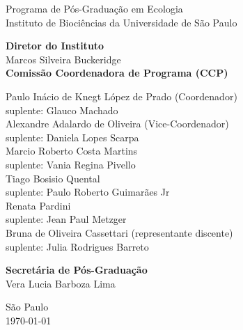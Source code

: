 \begin{center}

{\LARGE Programa de Pós-Graduação em Ecologia \\[1ex]
  Instituto de Biociências da Universidade de São Paulo\\[1ex]
  }
\par
\vspace{0.01\paperheight}
{\Large 
\textbf{Diretor do Instituto} \\[0.5em]
Marcos Silveira Buckeridge\\
\vspace{2em}
\textbf{Comissão Coordenadora de Programa (CCP)} \\[0.5em]
\begin{spacing}{1.2}
  Paulo Inácio de Knegt López de Prado (Coordenador)\\
  suplente: Glauco Machado \\ [0.75 em]
  Alexandre Adalardo de Oliveira (Vice-Coordenador)\\
  suplente: Daniela Lopes Scarpa \\ [0.75 em]
  Marcio Roberto Costa Martins\\
  suplente: Vania Regina Pivello \\ [0.75 em]
  Tiago Bosisio Quental\\
  suplente: Paulo Roberto Guimarães Jr\\ [0.75 em]
  Renata Pardini\\
  suplente:  Jean Paul Metzger  \\ [0.75 em]
  Bruna de Oliveira Cassettari (representante discente)\\
  suplente:  Julia Rodrigues Barreto
\end{spacing}
\vspace{1.25em}
\textbf{Secretária de Pós-Graduação}\\[0.5em]
Vera Lucia Barboza Lima\\
}

\vfill

{\Large São Paulo\\
\today}
\end{center}

\newpage

\tableofcontents

